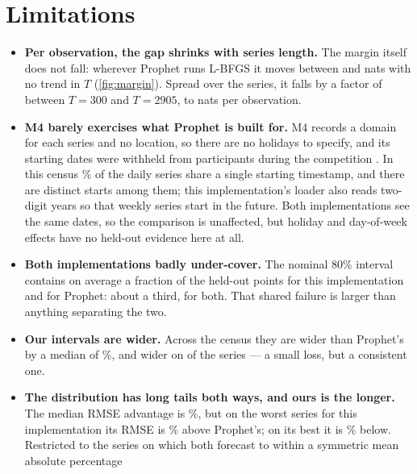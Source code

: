 \section{Limitations}
\label{sec:limitations}

\begin{itemize}
  \item \textbf{Per observation, the gap shrinks with series length.} The
        margin itself does not fall: wherever Prophet runs L-BFGS it moves between
        \MarginLbfgsMin{} and \MarginLbfgsMax{} nats with no trend in $T$
        (\cref{fig:margin}). Spread over the series, it falls by a factor of
        \LpPerObsDecline{} between $T = 300$ and $T = 2905$, to \LpPerObsLong{} nats
        per observation.
  \item \textbf{M4 barely exercises what Prophet is built for.} M4 records a
        domain for each series and no location, so there are no holidays to
        specify, and its starting dates were withheld from participants during
        the competition \citep{m4methods}. In this census \LimDailyModalShare\%
        of the daily series share a single starting timestamp, and there are
        \LimDailyStarts{} distinct starts among them; this implementation's loader
        also reads two-digit years so that \LimWeeklyFutureStarts{} weekly series
        start in the future. Both implementations see the same dates, so the
        comparison is unaffected, but holiday and day-of-week effects have no
        held-out evidence here at all.
  \item \textbf{Both implementations badly under-cover.} The nominal 80\%
        interval contains on average a fraction \LimCoverageOurs{} of the held-out
        points for this implementation and \LimCoverageProphet{} for Prophet:
        about a third, for both. That shared failure is larger than anything
        separating the two.
  \item \textbf{Our intervals are wider.} Across the census they are wider than
        Prophet's by a median of \LimWidthMedian\%, and wider on \LimWidthWider{} of
        the \CensusSeries{} series --- a small loss, but a consistent one.
  \item \textbf{The distribution has long tails both ways, and ours is the longer.}
        The median RMSE advantage is \RmseAdvantage\%, but on the worst series for
        this implementation its RMSE is \LimWorstCensus\% above Prophet's; on its
        best it is \LimBestCensus\% below. Restricted to the \LimPoolSize{} series
        on which both forecast to within a symmetric mean absolute percentage

\end{itemize}

